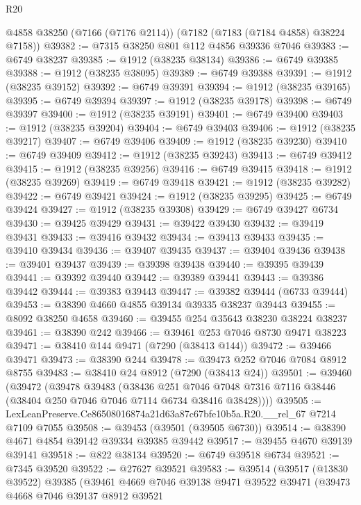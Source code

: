 \begin{lexlean}{R20}
\begin{coremodule}
{    @4858
    @38250
    (@7166 (@7176 @2114))
    (@7182 (@7183 (@7184 @4858) @38224 @7158))
@39382 := @7315 @38250 @801 @112 @4856 @39336 @7046
@39383 := @6749 @38237
@39385 := @1912 (@38235 @38134)
@39386 := @6749 @39385
@39388 := @1912 (@38235 @38095)
@39389 := @6749 @39388
@39391 := @1912 (@38235 @39152)
@39392 := @6749 @39391
@39394 := @1912 (@38235 @39165)
@39395 := @6749 @39394
@39397 := @1912 (@38235 @39178)
@39398 := @6749 @39397
@39400 := @1912 (@38235 @39191)
@39401 := @6749 @39400
@39403 := @1912 (@38235 @39204)
@39404 := @6749 @39403
@39406 := @1912 (@38235 @39217)
@39407 := @6749 @39406
@39409 := @1912 (@38235 @39230)
@39410 := @6749 @39409
@39412 := @1912 (@38235 @39243)
@39413 := @6749 @39412
@39415 := @1912 (@38235 @39256)
@39416 := @6749 @39415
@39418 := @1912 (@38235 @39269)
@39419 := @6749 @39418
@39421 := @1912 (@38235 @39282)
@39422 := @6749 @39421
@39424 := @1912 (@38235 @39295)
@39425 := @6749 @39424
@39427 := @1912 (@38235 @39308)
@39429 := @6749 @39427 @6734
@39430 := @39425 @39429
@39431 := @39422 @39430
@39432 := @39419 @39431
@39433 := @39416 @39432
@39434 := @39413 @39433
@39435 := @39410 @39434
@39436 := @39407 @39435
@39437 := @39404 @39436
@39438 := @39401 @39437
@39439 := @39398 @39438
@39440 := @39395 @39439
@39441 := @39392 @39440
@39442 := @39389 @39441
@39443 := @39386 @39442
@39444 := @39383 @39443
@39447 := @39382 @39444 (@6733 @39444)
@39453 := @38390 @4660 @4855 @39134 @39335 @38237 @39443
@39455 := @8092 @38250 @4658
@39460 := @39455 @254 @35643 @38230 @38224 @38237
@39461 := @38390 @242
@39466 := @39461 @253 @7046 @8730 @9471 @38223
@39471 := @38410 @144 @9471 (@7290 (@38413 @144))
@39472 := @39466 @39471
@39473 := @38390 @244
@39478 := @39473 @252 @7046 @7084 @8912 @8755
@39483 := @38410 @24 @8912 (@7290 (@38413 @24))
@39501 := @39460
    (@39472
      (@39478
        @39483
        (@38436
          @251
          @7046
          @7048
          @7316
          @7116
          @38446
          (@38404 @250 @7046 @7046 @7114 @6734 @38416 @38428))))
@39505 := LexLeanPreserve.Ce86508016874a21d63a87c67bfe10b5a.R20.__rel_67 @7214 @7109 @7055
@39508 := @39453 (@39501 (@39505 @6730))
@39514 := @38390 @4671 @4854 @39142 @39334 @39385 @39442
@39517 := @39455 @4670 @39139 @39141
@39518 := @822 @38134
@39520 := @6749 @39518 @6734
@39521 := @7345 @39520
@39522 := @27627 @39521
@39583 := @39514
    (@39517
      (@13830 @39522)
      @39385
      (@39461
        @4669
        @7046
        @39138
        @9471
        @39522
        @39471
        (@39473
          @4668
          @7046
          @39137
          @8912
          @39521
}
\end{coremodule}
\end{lexlean}
